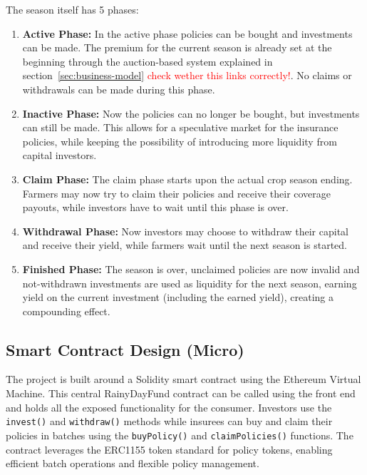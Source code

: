 \documentclass[11pt,a4paper]{article}
\begin{document}
    The season itself has 5 phases:
    \begin{enumerate}
        \item \textbf{Active Phase:} In the active phase policies can be bought and investments can be made.
        The premium for the current season is already set at the beginning through the auction-based system explained in section~\ref{sec:business-model} \textcolor{red}{check wether this links correctly!}.
        No claims or withdrawals can be made during this phase.
        \item \textbf{Inactive Phase:} Now the policies can no longer be bought, but investments can still be made.
        This allows for a speculative market for the insurance policies, while keeping the possibility of introducing more liquidity from capital investors.
        \item \textbf{Claim Phase:} The claim phase starts upon the actual crop season ending.
        Farmers may now try to claim their policies and receive their coverage payouts, while investors have to wait until this phase is over.
        \item \textbf{Withdrawal Phase:} Now investors may choose to withdraw their capital and receive their yield, while farmers wait until the next season is started.
        \item \textbf{Finished Phase:} The season is over, unclaimed policies are now invalid and not-withdrawn investments are used as liquidity for the next season, earning yield on the current investment (including the earned yield), creating a compounding effect.
    \end{enumerate}

    \subsection{Smart Contract Design (Micro)}\label{subsec:smart-contract-design}
    The project is built around a Solidity smart contract using the Ethereum Virtual Machine.
    This central RainyDayFund contract can be called using the front end and holds all the exposed functionality for the consumer.
    Investors use the \texttt{invest()} and \texttt{withdraw()} methods while insurees can buy and claim their policies in batches using the \texttt{buyPolicy()} and \texttt{claimPolicies()} functions.
    The contract leverages the ERC1155 token standard for policy tokens, enabling efficient batch operations and flexible policy management.
\end{document}
